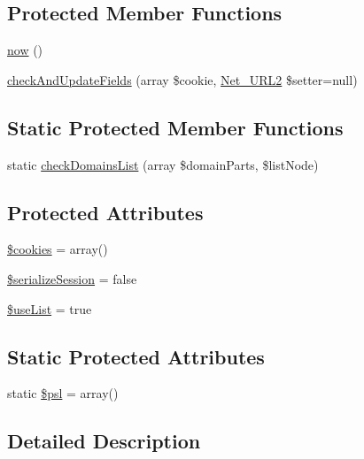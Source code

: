 \subsection*{Protected Member Functions}
\begin{DoxyCompactItemize}
\item 
\hyperlink{classHTTP__Request2__CookieJar_af7f3ec95c4a5b2594004b455c82081d6}{now} ()
\item 
\hyperlink{classHTTP__Request2__CookieJar_a518f04b3620e71b98390e2915e6e6d20}{check\+And\+Update\+Fields} (array \$cookie, \hyperlink{classNet__URL2}{Net\+\_\+\+U\+R\+L2} \$setter=null)
\end{DoxyCompactItemize}
\subsection*{Static Protected Member Functions}
\begin{DoxyCompactItemize}
\item 
static \hyperlink{classHTTP__Request2__CookieJar_a7a04c4cd3170cbf23b42e2cdc1409e7a}{check\+Domains\+List} (array \$domain\+Parts, \$list\+Node)
\end{DoxyCompactItemize}
\subsection*{Protected Attributes}
\begin{DoxyCompactItemize}
\item 
\hyperlink{classHTTP__Request2__CookieJar_ab7bfdc0aa06d9b09b8050cfbdb1afacf}{\$cookies} = array()
\item 
\hyperlink{classHTTP__Request2__CookieJar_ae5e881693fdcfe8cdc23966be0d8a218}{\$serialize\+Session} = false
\item 
\hyperlink{classHTTP__Request2__CookieJar_a931db790fefc72638f7220fc45f16a55}{\$use\+List} = true
\end{DoxyCompactItemize}
\subsection*{Static Protected Attributes}
\begin{DoxyCompactItemize}
\item 
static \hyperlink{classHTTP__Request2__CookieJar_a3ff030e15c5780c2812814e8e7d3131d}{\$psl} = array()
\end{DoxyCompactItemize}


\subsection{Detailed Description}


